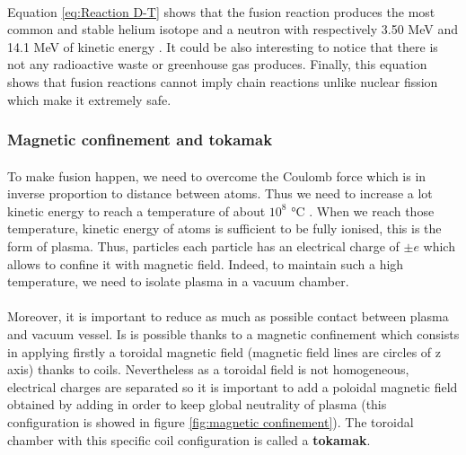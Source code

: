 \documentclass[12pt]{article}
\begin{document}
\paragraph{}
Equation \ref{eq:Reaction D-T} shows that the fusion reaction produces the most common and stable helium isotope and a neutron with respectively 3.50 MeV and 14.1 MeV of kinetic energy \cite{holger_reimerdes_mhd_2001}. It could be also interesting to notice that there is not any radioactive waste or greenhouse gas produces. Finally, this equation shows that fusion reactions cannot imply chain reactions unlike nuclear fission which make it extremely safe. 

\subsubsection{Magnetic confinement and tokamak}

\paragraph{}
To make fusion happen, we need to overcome the Coulomb force which is in inverse proportion to distance between atoms. Thus we need to increase a lot kinetic energy to reach a temperature of about \(10^8\) °C \cite{yves_martin_fusion_2014}. When we reach those temperature, kinetic energy of atoms is sufficient to be fully ionised, this is the form of plasma. Thus, particles each particle has an electrical charge of \(\pm e\) which allows to confine it with magnetic field. Indeed, to maintain such a high temperature, we need to isolate plasma in a vacuum chamber. 

\paragraph{}
Moreover, it is important to reduce as much as possible contact between plasma and vacuum vessel. Is is possible thanks to a magnetic confinement which consists in applying firstly a toroidal magnetic field (magnetic field lines are circles of z axis) thanks to coils. Nevertheless as a toroidal field is not homogeneous, electrical charges are separated so it is important to add a poloidal magnetic field obtained by adding in order to keep global neutrality of plasma (this configuration is showed in figure \ref{fig:magnetic confinement}).  The toroidal chamber with this specific coil configuration is called a \textbf{tokamak}. 
\end{document}
